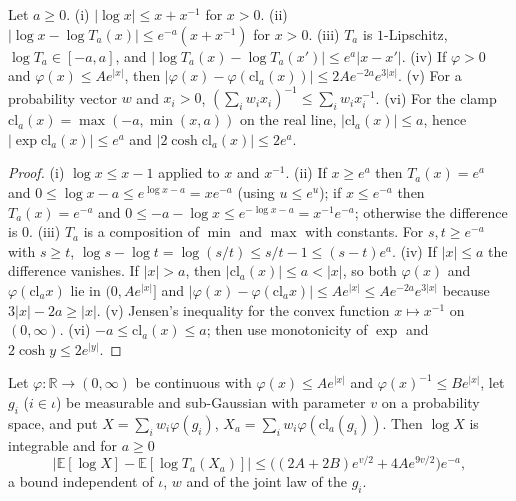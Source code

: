 \begin{lemma}\label{lem:sg:clamp}
  \leanok
Let $a\ge0$. (i) $|\log x|\le x+x^{-1}$ for $x>0$. (ii) $|\log x-\log T_a(x)|\le e^{-a}(x+x^{-1})$ for $x>0$. (iii) $T_a$ is $1$-Lipschitz, $\log T_a\in[-a,a]$,
and $|\log T_a(x)-\log T_a(x')|\le e^a|x-x'|$. (iv) If $\varphi>0$ and $\varphi(x)\le Ae^{|x|}$, then
$|\varphi(x)-\varphi(\mathrm{cl}_a(x))|\le2Ae^{-2a}e^{3|x|}$. (v) For a probability vector $w$ and $x_i>0$, $(\sum_iw_ix_i)^{-1}\le\sum_iw_ix_i^{-1}$. (vi) For the clamp $\mathrm{cl}_a(x)=\max(-a,\min(x,a))$ on the real line, $|\mathrm{cl}_a(x)|\le a$, hence $|\exp\mathrm{cl}_a(x)|\le e^a$ and $|2\cosh\mathrm{cl}_a(x)|\le2e^a$.
\end{lemma}

\begin{proof}
  \leanok
(i) $\log x\le x-1$ applied to $x$ and $x^{-1}$. (ii) If $x\ge e^a$ then $T_a(x)=e^a$ and $0\le\log x-a\le e^{\log x-a}=xe^{-a}$ (using $u\le e^u$); if $x\le e^{-a}$
then $T_a(x)=e^{-a}$ and $0\le-a-\log x\le e^{-\log x-a}=x^{-1}e^{-a}$; otherwise the difference is $0$. (iii) $T_a$ is a composition of $\min$ and $\max$ with
constants. For $s,t\ge e^{-a}$ with $s\ge t$, $\log s-\log t=\log(s/t)\le s/t-1\le(s-t)e^a$. (iv) If $|x|\le a$ the difference vanishes. If $|x|>a$, then
$|\mathrm{cl}_a(x)|\le a<|x|$, so both $\varphi(x)$ and $\varphi(\mathrm{cl}_ax)$ lie in $(0,Ae^{|x|}]$ and $|\varphi(x)-\varphi(\mathrm{cl}_ax)|\le Ae^{|x|}\le Ae^{-2a}e^{3|x|}$
because $3|x|-2a\ge|x|$. (v) Jensen's inequality for the convex function $x\mapsto x^{-1}$ on $(0,\infty)$. (vi) $-a\le\mathrm{cl}_a(x)\le a$; then use monotonicity of $\exp$ and $2\cosh y\le 2e^{|y|}$.
\end{proof}

\begin{theorem}\label{thm:sg:gibbs-truncation}
  \leanok
Let $\varphi:\mathbb R\to(0,\infty)$ be continuous with $\varphi(x)\le Ae^{|x|}$ and $\varphi(x)^{-1}\le Be^{|x|}$, let $g_i$ ($i\in\iota$) be measurable and
sub-Gaussian with parameter $v$ on a probability space, and put $X=\sum_iw_i\varphi(g_i)$, $X_a=\sum_iw_i\varphi(\mathrm{cl}_a(g_i))$. Then $\log X$ is integrable and for $a\ge0$
\[\Big|\mathbb E[\log X]-\mathbb E[\log T_a(X_a)]\Big|\le\Big((2A+2B)e^{v/2}+4Ae^{9v/2}\Big)e^{-a},\]
a bound independent of $\iota$, $w$ and of the joint law of the $g_i$.
\end{theorem}

